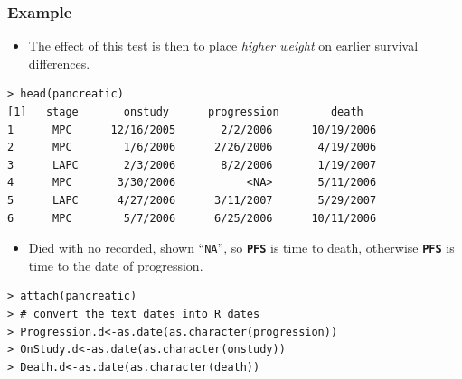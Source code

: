 \documentclass{beamer}
\newcommand{\empr}[1]{{\emph{\color{red}#1}}}
\newcommand{\pkg}[1]{{\textbf{\texttt{#1}}}}
\begin{document}
\pagebreak
\begin{frame}[fragile]
\frametitle{Example}
\begin{itemize}
\item The effect of this test is then to place \empr{higher weight} on {\color{red}earlier} survival differences.
\end{itemize}
\begin{Verbatim}
> head(pancreatic)
[1]   stage       onstudy      progression        death
1      MPC      12/16/2005       2/2/2006      10/19/2006 
2      MPC        1/6/2006      2/26/2006       4/19/2006
3      LAPC       2/3/2006       8/2/2006       1/19/2007
4      MPC       3/30/2006           <NA>       5/11/2006 
5      LAPC      4/27/2006      3/11/2007       5/29/2007 
6      MPC        5/7/2006      6/25/2006      10/11/2006
\end{Verbatim}
\begin{itemize}
\item Died with no recorded, shown ``\texttt{NA}'', so \pkg{PFS} is time to death, otherwise \pkg{PFS} is time to the date of progression.
\end{itemize}
\begin{Verbatim}
> attach(pancreatic)
> # convert the text dates into R dates
> Progression.d<-as.date(as.character(progression))
> OnStudy.d<-as.date(as.character(onstudy))
> Death.d<-as.date(as.character(death))
\end{Verbatim}
\end{frame}
\end{document}
